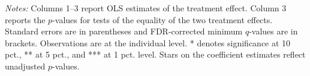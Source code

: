 \begin{table}[h]
{\begin{threeparttable}
\begin{tabular}{l*{5}{c}}
\bottomrule \end{tabular} \begin{tablenotes}[flushleft] \footnotesize \item \emph{Notes:} Columns 1--3 report OLS estimates of the treatment effect. Column 3 reports the \(p\)-values for tests of the equality of the two treatment effects. Standard errors are in parentheses and FDR-corrected minimum \(q\)-values are in brackets. Observations are at the individual level. * denotes significance at 10 pct., ** at 5 pct., and *** at 1 pct. level. Stars on the coefficient estimates reflect unadjusted \(p\)-values. \end{tablenotes} \end{threeparttable} } \end{table}

